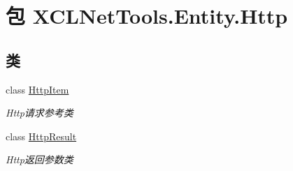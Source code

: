 \hypertarget{namespace_x_c_l_net_tools_1_1_entity_1_1_http}{\section{包 X\-C\-L\-Net\-Tools.\-Entity.\-Http}
\label{namespace_x_c_l_net_tools_1_1_entity_1_1_http}
}
\subsection*{类}
\begin{DoxyCompactItemize}
\item 
class \hyperlink{class_x_c_l_net_tools_1_1_entity_1_1_http_1_1_http_item}{Http\-Item}
\begin{DoxyCompactList}\small\item\em Http请求参考类 \end{DoxyCompactList}\item 
class \hyperlink{class_x_c_l_net_tools_1_1_entity_1_1_http_1_1_http_result}{Http\-Result}
\begin{DoxyCompactList}\small\item\em Http返回参数类 \end{DoxyCompactList}\end{DoxyCompactItemize}

